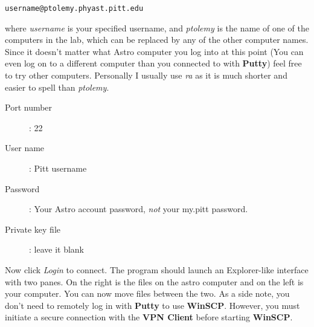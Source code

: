 \documentclass[11pt, preprint]{aastex}
\begin{document}
\begin{verbatim}
username@ptolemy.phyast.pitt.edu
\end{verbatim}
where \emph{username} is your specified username, and \emph{ptolemy} is the name of one of the computers in the lab, which can be replaced by any of the other computer names. Since it doesn't matter what Astro computer you log into at this point (You can even log on to a different computer than you connected to with \textbf{Putty}) feel free to try other computers. Personally I usually use \emph{ra} as it is much shorter and easier to spell than \emph{ptolemy}. 

\begin{description}
\item[Port number] : 22
\item[User name] : Pitt username
\item[Password] : Your Astro account password, \emph{not} your my.pitt password.
\item[Private key file] : leave it blank
\end{description}

Now click \emph{Login} to connect. The program should launch an Explorer-like interface with two panes. On the right is the files on the astro computer and on the left is your computer. You can now move files between the two. As a side note, you don't need to remotely log in with \textbf{Putty} to use \textbf{WinSCP}. However, you must initiate a secure connection with the \textbf{VPN Client} before starting \textbf{WinSCP}.
\end{document}
